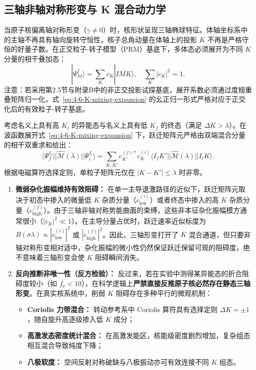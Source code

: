\subsection{三轴非轴对称形变与 K 混合动力学}\label{sec:4-6-3}

当原子核偏离轴对称形变（$\gamma \ne 0$）时，核形状呈现三轴椭球特征。体轴坐标系中的主轴不再具有轴向旋转守恒性，核子总角动量在体轴上的投影 $K$ 不再是严格守恒的好量子数。在正交粒子-转子模型（PRM）基底下，多体态必须展开为不同 $K$ 分量的相干叠加态：
\begin{equation}\label{eq:4-6-K-mixing-expansion}
|\Psi_M^I\rangle = \sum_{K} c_K |I M K\rangle, \quad \sum_K |c_K|^2 = 1.
\end{equation}
注意：若采用第2.5节与附录B中的非正交投影试探基底，展开系数必须通过度规重叠矩阵归一化，式~\eqref{eq:4-6-K-mixing-expansion} 的幺正归一形式严格对应于正交化后的有效粒子-转子基底。

考虑名义上具有高 $K_i$ 的异能态与名义上具有低 $K_f$ 的终态（满足 $\Delta K > \lambda$）。在波函数展开式~\eqref{eq:4-6-K-mixing-expansion} 下，跃迁矩阵元严格由双端混合分量的相干双重求和给出：
\begin{equation}\label{eq:4-6-K-mixed-matrix-element}
\langle \Psi_f^{I_f} || \hat{\mathcal{M}}(\lambda) || \Psi_i^{I_i} \rangle = \sum_{K, K'} c_{K'}^{(f)*} c_K^{(i)} \langle I_f K' || \hat{\mathcal{M}}(\lambda) || I_i K \rangle.
\end{equation}
根据电磁算符选择定则，单粒子矩阵元仅在 $|K - K'| \le \lambda$ 时非零。
\begin{enumerate}
\item \textbf{微弱杂化振幅维持有效阻碍：}
在单一主导退激路径的近似下，跃迁矩阵元取决于初态中掺入的微量低 $K$ 杂质分量（$c_{\mathrm{low}}^{(i)}$）或者终态中掺入的高 $K$ 杂质分量（$c_{\mathrm{high}}^{(f)}$）。由于三轴非轴对称势能曲面的束缚，这些非本征杂化振幅模方通常很小（$|c_K|^2 \ll 1$）。在主导分量占优时，跃迁速率近似标度为 $B(\sigma\lambda) \propto |c_{\mathrm{low}}^{(i)}|^2$ 或 $|c_{\mathrm{high}}^{(f)}|^2$。因此，三轴形变打开了 $K$ 混合通道，但只要非轴对称形变相对适中，杂化振幅的微小性仍然保证跃迁保留可观的阻碍度，绝不意味着三轴形变会使 $K$ 阻碍瞬间消失。
\item \textbf{反向推断非唯一性（反方检验）：}
反过来，若在实验中测得某异能态的折合阻碍度较小（如 $f_\nu < 10$），在科学逻辑上\textbf{严禁直接反推原子核必然存在静态三轴形变}。在真实核系统中，削弱 $K$ 阻碍存在多种平行的微观机制：
\begin{itemize}
\item \textbf{Coriolis 力带混合：} 转动参考系中 Coriolis 算符具有选择定则 $\Delta K = \pm 1$，随自旋升高逐级掺入低 $K$ 成分；
\item \textbf{高激发态密度统计混合：} 在高激发能区，核能级密度剧烈增加，复杂组态相互混合导致纯度下降；
\item \textbf{八极软度：} 空间反射对称破缺与八极振动亦可有效连接不同 $K$ 组态。
\end{itemize}
\end{enumerate}

